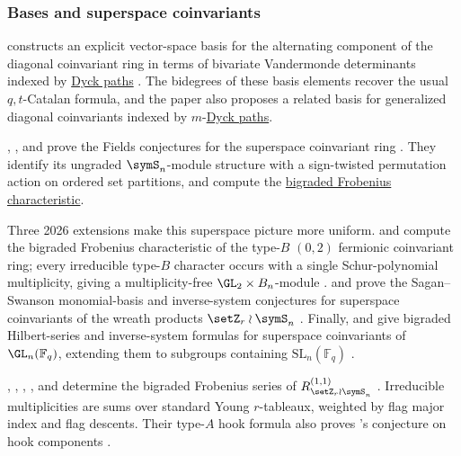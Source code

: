 \subsubsection[diagonalSuperspaceCoinvariants]{Bases and superspace coinvariants}

 constructs an explicit vector-space basis for the
alternating component of the diagonal coinvariant ring in terms of bivariate
Vandermonde determinants indexed by \hyperref[qtCatalan]{Dyck paths}
\cite{Jiang2025x}.  The
bidegrees of these basis elements recover the usual $q,t$-Catalan formula,
and the paper also proposes a related basis for generalized diagonal
coinvariants indexed by $m$-\hyperref[qtCatalan]{Dyck paths}.

, , and  prove
the Fields conjectures for the superspace coinvariant ring
\cite{MuraiRhoadesWilson2025x}.  They identify its ungraded
$\symS_n$-module structure with a sign-twisted permutation action on ordered
set partitions, and compute the \hyperref[frobeniusCharacteristic]{bigraded
Frobenius characteristic}.

Three 2026 extensions make this superspace picture more uniform.
 and  compute the bigraded Frobenius
characteristic of the type-$B$ $(0,2)$ fermionic coinvariant ring; every
irreducible type-$B$ character occurs with a single Schur-polynomial
multiplicity, giving a multiplicity-free $\GL_2\times B_n$-module
\cite{JiangLentfer2026x}.   and
 prove the Sagan--Swanson monomial-basis and
inverse-system conjectures for superspace coinvariants of the wreath products
$\setZ_r\wr\symS_n$ \cite{BhattacharyaRhoades2026x}.  Finally,
 and  give bigraded Hilbert-series
and inverse-system formulas for superspace coinvariants of
$\GL_n(\mathbb F_q)$, extending them to subgroups containing
$\mathrm{SL}_n(\mathbb F_q)$ \cite{RhoadesWilson2026x}.

, , ,
, and  determine the bigraded
Frobenius series of $R^{(1,1)}_{\setZ_r\wr\symS_n}$
\cite[Thm.~1]{BhattacharyaCorteelJiangLentferRhoades2026x}.
Irreducible multiplicities are sums over standard Young $r$-tableaux,
weighted by flag major index and flag descents. Their type-$A$ hook formula
also proves 's conjecture on hook components
\cite[Cor.~55]{BhattacharyaCorteelJiangLentferRhoades2026x}.

